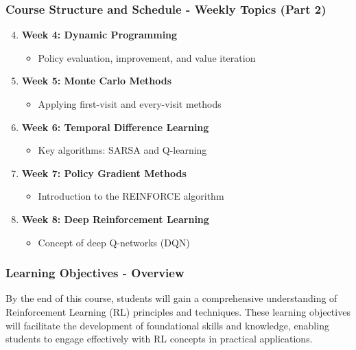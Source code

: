 \documentclass[aspectratio=169]{beamer}
\begin{document}
\begin{frame}[fragile]
    \frametitle{Course Structure and Schedule - Weekly Topics (Part 2)}
    \begin{enumerate}
        \setcounter{enumi}{3} %
        \item \textbf{Week 4: Dynamic Programming}
            \begin{itemize}
                \item Policy evaluation, improvement, and value iteration
            \end{itemize}
        \item \textbf{Week 5: Monte Carlo Methods}
            \begin{itemize}
                \item Applying first-visit and every-visit methods
            \end{itemize}
        \item \textbf{Week 6: Temporal Difference Learning}
            \begin{itemize}
                \item Key algorithms: SARSA and Q-learning
            \end{itemize}
        \item \textbf{Week 7: Policy Gradient Methods}
            \begin{itemize}
                \item Introduction to the REINFORCE algorithm
            \end{itemize}
        \item \textbf{Week 8: Deep Reinforcement Learning}
            \begin{itemize}
                \item Concept of deep Q-networks (DQN)
            \end{itemize}
    \end{enumerate}
\end{frame}

\begin{frame}[fragile]
    \frametitle{Learning Objectives - Overview}
    By the end of this course, students will gain a comprehensive understanding of Reinforcement Learning (RL) principles and techniques. These learning objectives will facilitate the development of foundational skills and knowledge, enabling students to engage effectively with RL concepts in practical applications.
\end{frame}
\end{document}
